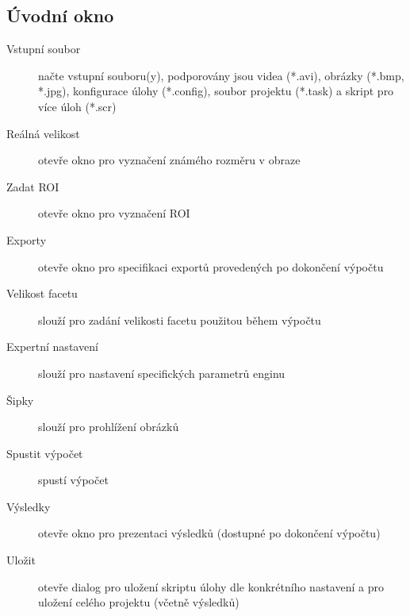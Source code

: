 \documentclass[a4paper,12pt]{article}
\begin{document}
\subsection{Úvodní okno}
\begin{figure}[H]
\end{figure}
\begin{description}
\item[Vstupní soubor] načte vstupní souboru(y), podporovány jsou videa (*.avi), obrázky (*.bmp, *.jpg), konfigurace úlohy (*.config), soubor projektu (*.task) a skript pro více úloh (*.scr)
\item[Reálná velikost] otevře okno pro vyznačení známého rozměru v obraze
\item[Zadat ROI] otevře okno pro vyznačení ROI
\item[Exporty] otevře okno pro specifikaci exportů provedených po dokončení výpočtu
\item[Velikost facetu] slouží pro zadání velikosti facetu použitou během výpočtu
\item[Expertní nastavení] slouží pro nastavení specifických parametrů enginu
\item[Šipky] slouží pro prohlížení obrázků
\item[Spustit výpočet] spustí výpočet
\item[Výsledky] otevře okno pro prezentaci výsledků (dostupné po dokončení výpočtu)
\item[Uložit] otevře dialog pro uložení skriptu úlohy dle konkrétního nastavení a pro uložení celého projektu (včetně výsledků)        
\end{description}
\newpage
\end{document}
